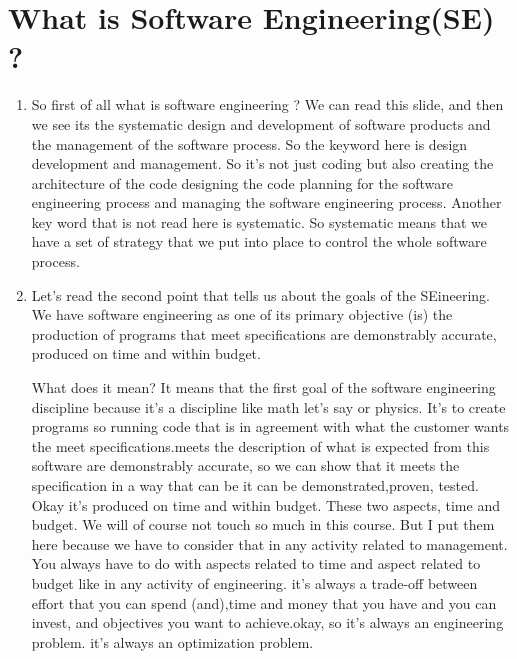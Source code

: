 \documentclass[conference, compsoc, twoside]{IEEEtran}
\begin{document}
\section{What is Software Engineering(SE) ?} %
\begin{enumerate}	
	\item So first of all what is software engineering ? We can read this slide, and then we see its the systematic design and development of software products and the management of the software process. So the keyword here is design development and management. So it's not just coding but also creating the architecture of the code designing the code planning for the software engineering process and managing the software engineering process. Another key word that is not read here is systematic. So systematic means that we have a set of strategy that we put into place to control the whole software process.
	\item Let's read the second point that tells us about the goals of the SEineering. 
	We have software engineering as one of its primary objective (is) the production of programs that meet specifications are demonstrably accurate, produced on time and within budget.

	What does it mean? It means that the first goal of the software engineering discipline because it's a discipline like math let's say or physics. It's to create programs so running code that is in agreement with what the customer wants the meet specifications.meets the description of what is expected from this software are demonstrably accurate, so we can show that it meets the specification in a way that can be it can be demonstrated,proven, tested.
	Okay it's produced on time and within budget.
	These two aspects, time and budget. We will of course not touch so much in this course.
	But I put them here because we have to consider that in any activity related to management.
	You always have to do with aspects related to time and aspect related to budget like in any activity of engineering.
	it's always a trade-off between effort that you can spend (and),time and money that you have and you can invest, and objectives you want to achieve.okay, so it's always an engineering problem. it's always an optimization problem.	

\end{enumerate}
\end{document}
